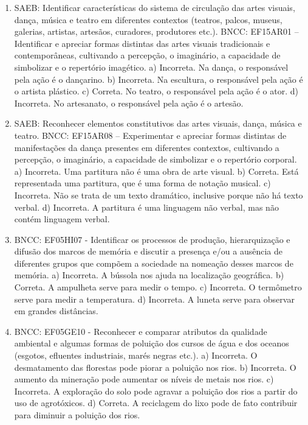 \begin{enumerate}
\item
SAEB: Identificar características do sistema de circulação das artes
visuais, dança, música e teatro em diferentes contextos (teatros,
palcos, museus, galerias, artistas, artesãos, curadores, produtores
etc.).
BNCC: EF15AR01 – Identificar e apreciar formas distintas das artes
visuais tradicionais e contemporâneas, cultivando a percepção, o
imaginário, a capacidade de simbolizar e o repertório imagético.
a)  Incorreta. Na dança, o responsável pela ação é o dançarino.
b)  Incorreta. Na escultura, o responsável pela ação é o artista plástico.
c)  Correta. No teatro, o responsável pela ação é o ator.
d)  Incorreta. No artesanato, o responsável pela ação é o artesão.

\item
SAEB: Reconhecer elementos constitutivos das artes visuais, dança,
música e teatro.
BNCC: EF15AR08 – Experimentar e apreciar formas distintas de
manifestações da dança presentes em diferentes contextos, cultivando a
percepção, o imaginário, a capacidade de simbolizar e o repertório
corporal.
a) Incorreta. Uma partitura não é uma obra de arte visual.
b) Correta. Está representada uma partitura, que é uma forma de notação musical.
c) Incorreta. Não se trata de um texto dramático, inclusive porque não há texto verbal.
d) Incorreta. A partitura é uma linguagem não verbal, mas não contém linguagem verbal.

\item
BNCC: EF05HI07 - Identificar os processos de produção, hierarquização e
difusão dos marcos de memória e discutir a presença e/ou a ausência de
diferentes grupos que compõem a sociedade na nomeação desses marcos de
memória.
a) Incorreta. A bússola nos ajuda na localização geográfica.
b) Correta. A ampulheta serve para medir o tempo.
c) Incorreta. O termômetro serve para medir a temperatura.
d) Incorreta. A luneta serve para observar em grandes distâncias.

\item
BNCC: EF05GE10 - Reconhecer e comparar atributos da qualidade
ambiental e algumas formas de poluição dos cursos de água e dos oceanos
(esgotos, efluentes industriais, marés negras etc.).
a) Incorreta. O desmatamento das florestas pode piorar a poluição nos
rios.
b) Incorreta. O aumento da mineração pode aumentar os níveis de metais
nos rios.
c) Incorreta. A exploração do solo pode agravar a poluição dos rios a
partir do uso de agrotóxicos.
d) Correta. A reciclagem do lixo pode de fato contribuir para diminuir a
poluição dos rios.


\end{enumerate}
